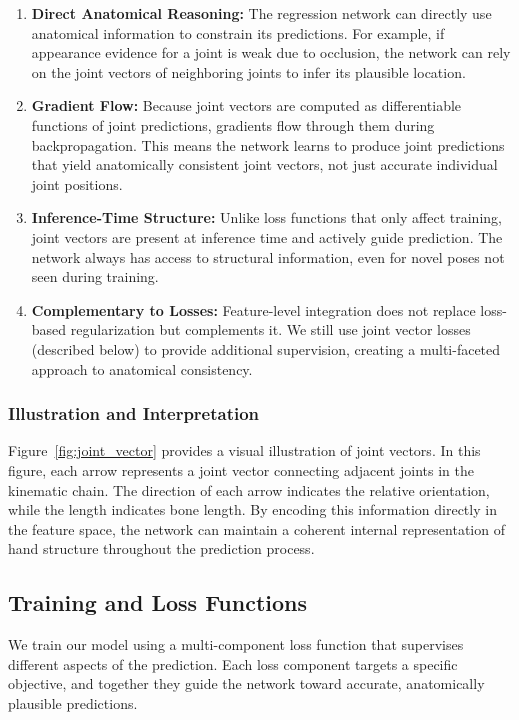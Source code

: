 \begin{enumerate}
    \item[(a)] \textbf{Direct Anatomical Reasoning:} The regression network can directly use anatomical information to constrain its predictions. For example, if appearance evidence for a joint is weak due to occlusion, the network can rely on the joint vectors of neighboring joints to infer its plausible location.

    \item[(b)] \textbf{Gradient Flow:} Because joint vectors are computed as differentiable functions of joint predictions, gradients flow through them during backpropagation. This means the network learns to produce joint predictions that yield anatomically consistent joint vectors, not just accurate individual joint positions.

    \item[(c)] \textbf{Inference-Time Structure:} Unlike loss functions that only affect training, joint vectors are present at inference time and actively guide prediction. The network always has access to structural information, even for novel poses not seen during training.

    \item[(d)] \textbf{Complementary to Losses:} Feature-level integration does not replace loss-based regularization but complements it. We still use joint vector losses (described below) to provide additional supervision, creating a multi-faceted approach to anatomical consistency.
\end{enumerate}

\subsubsection{Illustration and Interpretation}
Figure~\ref{fig:joint_vector} provides a visual illustration of joint vectors. In this figure, each arrow represents a joint vector connecting adjacent joints in the kinematic chain. The direction of each arrow indicates the relative orientation, while the length indicates bone length. By encoding this information directly in the feature space, the network can maintain a coherent internal representation of hand structure throughout the prediction process.

\subsection{Training and Loss Functions}
We train our model using a multi-component loss function that supervises different aspects of the prediction. Each loss component targets a specific objective, and together they guide the network toward accurate, anatomically plausible predictions.

